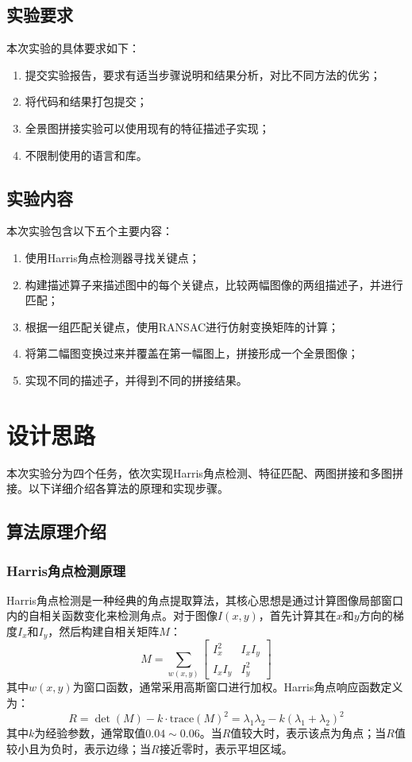 \documentclass[a4paper]{article}
\begin{document}
\subsection{实验要求}
本次实验的具体要求如下：
\begin{enumerate}
    \item 提交实验报告，要求有适当步骤说明和结果分析，对比不同方法的优劣；
    \item 将代码和结果打包提交；
    \item 全景图拼接实验可以使用现有的特征描述子实现；
    \item 不限制使用的语言和库。
\end{enumerate}

\subsection{实验内容}
本次实验包含以下五个主要内容：
\begin{enumerate}
    \item 使用Harris角点检测器寻找关键点；
    \item 构建描述算子来描述图中的每个关键点，比较两幅图像的两组描述子，并进行匹配；
    \item 根据一组匹配关键点，使用RANSAC进行仿射变换矩阵的计算；
    \item 将第二幅图变换过来并覆盖在第一幅图上，拼接形成一个全景图像；
    \item 实现不同的描述子，并得到不同的拼接结果。
\end{enumerate}

\section{设计思路}

本次实验分为四个任务，依次实现Harris角点检测、特征匹配、两图拼接和多图拼接。以下详细介绍各算法的原理和实现步骤。

\subsection{算法原理介绍}

\subsubsection{Harris角点检测原理}
Harris角点检测是一种经典的角点提取算法，其核心思想是通过计算图像局部窗口内的自相关函数变化来检测角点。对于图像$I(x,y)$，首先计算其在$x$和$y$方向的梯度$I_x$和$I_y$，然后构建自相关矩阵$M$：
\begin{equation}
M = \sum_{w(x,y)} \begin{bmatrix} I_x^2 & I_x I_y \\ I_x I_y & I_y^2 \end{bmatrix}
\end{equation}
其中$w(x,y)$为窗口函数，通常采用高斯窗口进行加权。Harris角点响应函数定义为：
\begin{equation}
R = \det(M) - k \cdot \text{trace}(M)^2 = \lambda_1 \lambda_2 - k(\lambda_1 + \lambda_2)^2
\end{equation}
其中$k$为经验参数，通常取值$0.04 \sim 0.06$。当$R$值较大时，表示该点为角点；当$R$值较小且为负时，表示边缘；当$R$接近零时，表示平坦区域。
\end{document}
